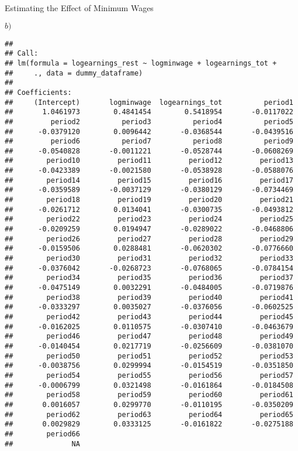 \documentclass[
  ignorenonframetext,
]{beamer}
\begin{document}
\begin{frame}[fragile]{Estimating the Effect of Minimum Wages}
\begin{block}{\(b)\)}
\begin{verbatim}
## 
## Call:
## lm(formula = logearnings_rest ~ logminwage + logearnings_tot + 
##     ., data = dummy_dataframe)
## 
## Coefficients:
##     (Intercept)       logminwage  logearnings_tot          period1  
##       1.0461973        0.4841454        0.5418954       -0.0117022  
##         period2          period3          period4          period5  
##      -0.0379120        0.0096442       -0.0368544       -0.0439516  
##         period6          period7          period8          period9  
##      -0.0540828       -0.0011221       -0.0528744       -0.0608269  
##        period10         period11         period12         period13  
##      -0.0423389       -0.0021580       -0.0538928       -0.0588076  
##        period14         period15         period16         period17  
##      -0.0359589       -0.0037129       -0.0380129       -0.0734469  
##        period18         period19         period20         period21  
##      -0.0261712        0.0134041       -0.0300735       -0.0493812  
##        period22         period23         period24         period25  
##      -0.0209259        0.0194947       -0.0289022       -0.0468806  
##        period26         period27         period28         period29  
##      -0.0159506        0.0288481       -0.0620302       -0.0776660  
##        period30         period31         period32         period33  
##      -0.0376042       -0.0268723       -0.0768065       -0.0784154  
##        period34         period35         period36         period37  
##      -0.0475149        0.0032291       -0.0484005       -0.0719876  
##        period38         period39         period40         period41  
##      -0.0333297        0.0035027       -0.0376056       -0.0602525  
##        period42         period43         period44         period45  
##      -0.0162025        0.0110575       -0.0307410       -0.0463679  
##        period46         period47         period48         period49  
##      -0.0140454        0.0217719       -0.0256609       -0.0381070  
##        period50         period51         period52         period53  
##      -0.0038756        0.0299994       -0.0154519       -0.0351850  
##        period54         period55         period56         period57  
##      -0.0006799        0.0321498       -0.0161864       -0.0184508  
##        period58         period59         period60         period61  
##       0.0016057        0.0299770       -0.0110195       -0.0350209  
##        period62         period63         period64         period65  
##       0.0029829        0.0333125       -0.0161822       -0.0275188  
##        period66  
##              NA
\end{verbatim}
\end{block}
\end{frame}
\end{document}
